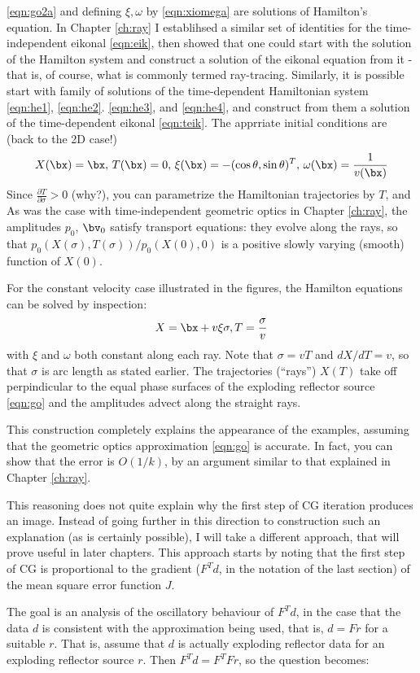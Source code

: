 \ref{eqn:go2a} and defining $\xi,\omega$ by \ref{eqn:xiomega} are solutions of Hamilton's equation. In Chapter \ref{ch:ray} I establihsed a similar set of identities for the time-independent eikonal \ref{eqn:eik}, then showed that one could start with the solution of the Hamilton system and construct a solution of the eikonal equation from it - that is, of course, what is commonly termed ray-tracing. Similarly, it is possible start with family of solutions of the time-dependent Hamiltonian system \ref{eqn:he1}, \ref{eqn:he2}. \ref{eqn:he3}, and \ref{eqn:he4}, and construct from them a solution of the time-dependent eikonal \ref{eqn:teik}. The apprriate initial conditions are (back to the 2D case!)
\[
X(\bx) = \bx, \,T(\bx) = 0,\, \xi(\bx) = -(\cos \theta, \sin \theta)^T,\, \omega(\bx)=\frac{1}{v(\bx)}
\]
Since $\frac{\partial T}{\partial \sigma} > 0$ (why?), you can parametrize the Hamiltonian trajectories by $T$, and 
As was the case with time-independent geometric optics in Chapter \ref{ch:ray}, the amplitudes $p_0$, $\bv_0$ satisfy transport equations: they evolve along the rays, so that $p_0(X(\sigma),T(\sigma))/p_0(X(0),0)$ is a positive slowly varying (smooth) function of $X(0)$. 

For the constant velocity case illustrated in the figures, the Hamilton equations can be solved by inspection:
\[
X = \bx + v \xi \sigma, T = \frac{\sigma}{v}
\]
with $\xi$ and $\omega$ both constant along each ray. Note that $\sigma = vT$ and $dX/dT = v$, so that $\sigma$ is arc length as stated earlier. The trajectories (``rays'') $X(T)$ take off perpindicular to the equal phase surfaces of the exploding reflector source \ref{eqn:go} and the amplitudes advect along the straight rays. 

This construction completely explains the appearance of the examples, assuming that the geometric optics approximation \ref{eqn:go} is accurate. In fact, you can show that the error is $O(1/k)$, by an argument similar to that explained in Chapter \ref{ch:ray}.

This reasoning does not quite explain why the first step of CG iteration produces an image. Instead of going further in this direction to construction such an explanation (as is certainly possible), I will take a different approach, that will prove useful in later chapters. This approach starts by noting that the first step of CG is proportional to the gradient ($F^Td$, in the notation of the last section) of the mean square error function $J$. 

The goal is an analysis of the oscillatory behaviour of $F^Td$, in the case that the data $d$ is consistent with the approximation being used, that is, $d=Fr$ for a suitable $r$. That is, assume that $d$ is actually exploding reflector data for an exploding reflector source $r$. Then $F^Td = F^TFr$, so the question becomes:

